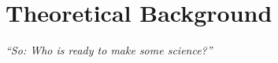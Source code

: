 \chapter{Theoretical Background}


\textit{``So: Who is ready to make some science?''} \\
 \\






